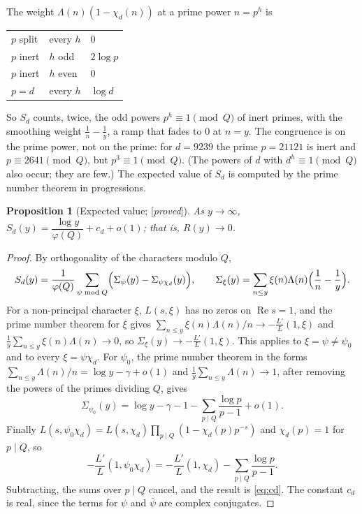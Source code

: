 \documentclass[11pt]{amsart}
\numberwithin{equation}{section}
\newtheorem{proposition}[theorem]{Proposition}
\theoremstyle{definition}
\theoremstyle{remark}
\newcommand{\re}{\operatorname{Re}}
\newcommand{\status}[1]{\textup{[\emph{#1}]}}
\begin{document}
The weight $\Lambda(n)(1-\chi_d(n))$ at a prime power $n=p^h$ is
\begin{center}\small
\begin{tabular}{@{}lll@{}}
\toprule
$p$ split & every $h$ & $0$\\
$p$ inert & $h$ odd & $2\log p$\\
$p$ inert & $h$ even & $0$\\
$p=d$ & every $h$ & $\log d$\\
\bottomrule
\end{tabular}
\end{center}
So $S_d$ counts, twice, the odd powers $p^h\equiv1\pmod Q$ of inert primes, with the smoothing weight $\frac1n-\frac1y$, a ramp that fades to $0$ at $n=y$. The congruence is on the prime power, not on the prime: for $d=9239$ the prime $p=21121$ is inert and $p\equiv2641\pmod Q$, but $p^3\equiv1\pmod Q$. (The powers of $d$ with $d^h\equiv1\pmod Q$ also occur; they are few.) The expected value of $S_d$ is computed by the prime number theorem in progressions.

\begin{proposition}[Expected value; \status{proved}]\label{prop:expected}
As $y\to\infty$, $S_d(y)=\dfrac{\log y}{\varphi(Q)}+c_d+o(1)$; that is, $R(y)\to0$.
\end{proposition}

\begin{proof}
By orthogonality of the characters modulo $Q$,
\begin{equation}
 S_d(y)=\frac1{\varphi(Q)}\sum_{\psi\bmod Q}\Bigl(\Sigma_\psi(y)-\Sigma_{\psi\chi_d}(y)\Bigr),\qquad \Sigma_\xi(y)=\sum_{n\le y}\xi(n)\Lambda(n)\Bigl(\frac1n-\frac1y\Bigr).
\end{equation}
For a non-principal character $\xi$, $L(s,\xi)$ has no zeros on $\re s=1$, and the prime number theorem for $\xi$ gives $\sum_{n\le y}\xi(n)\Lambda(n)/n\to-\frac{L'}{L}(1,\xi)$ and $\frac1y\sum_{n\le y}\xi(n)\Lambda(n)\to0$, so $\Sigma_\xi(y)\to-\frac{L'}{L}(1,\xi)$. This applies to $\xi=\psi\ne\psi_0$ and to every $\xi=\psi\chi_d$. For $\psi_0$, the prime number theorem in the forms $\sum_{n\le y}\Lambda(n)/n=\log y-\gamma+o(1)$ and $\frac1y\sum_{n\le y}\Lambda(n)\to1$, after removing the powers of the primes dividing $Q$, gives
\begin{equation}
 \Sigma_{\psi_0}(y)=\log y-\gamma-1-\sum_{p\mid Q}\frac{\log p}{p-1}+o(1).
\end{equation}
Finally $L(s,\psi_0\chi_d)=L(s,\chi_d)\prod_{p\mid Q}(1-\chi_d(p)p^{-s})$ and $\chi_d(p)=1$ for $p\mid Q$, so
\begin{equation}
 -\frac{L'}{L}(1,\psi_0\chi_d)=-\frac{L'}{L}(1,\chi_d)-\sum_{p\mid Q}\frac{\log p}{p-1}.
\end{equation}
Subtracting, the sums over $p\mid Q$ cancel, and the result is \eqref{eq:cd}. The constant $c_d$ is real, since the terms for $\psi$ and $\bar\psi$ are complex conjugates.
\end{proof}
\end{document}
